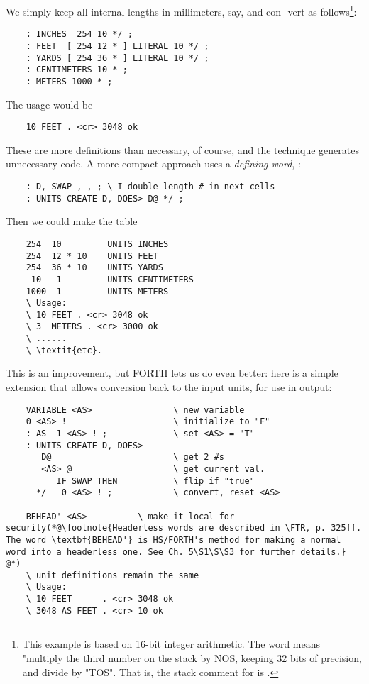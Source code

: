 We simply keep all internal lengths in millimeters, say, and con-
vert as follows\footnote{This example is based on 16-bit integer arithmetic. The word \regc{*/} means "multiply the third number on the stack by NOS, keeping 32 bits of precision, and divide by "TOS". That is, the stack comment for \regc{*/} is .}:

\begin{lstlisting}
    : INCHES  254 10 */ ;
    : FEET  [ 254 12 * ] LITERAL 10 */ ;
    : YARDS [ 254 36 * ] LITERAL 10 */ ;
    : CENTIMETERS 10 * ;
    : METERS 1000 * ;
\end{lstlisting}

The usage would be
\begin{lstlisting}
    10 FEET . <cr> 3048 ok
\end{lstlisting}

These are more definitions than necessary, of course, and the technique generates unnecessary code. A more compact approach uses a \textit{defining word}, :

\begin{lstlisting}
    : D, SWAP , , ; \ I double-length # in next cells
    : UNITS CREATE D, DOES> D@ */ ;
\end{lstlisting}

Then we could make the table
\begin{lstlisting}
    254  10         UNITS INCHES
    254  12 * 10    UNITS FEET
    254  36 * 10    UNITS YARDS
     10   1         UNITS CENTIMETERS
    1000  1         UNITS METERS
    \ Usage:
    \ 10 FEET . <cr> 3048 ok
    \ 3  METERS . <cr> 3000 ok
    \ ......
    \ \textit{etc}.
\end{lstlisting}

This is an improvement, but FORTH lets us do even better: here is a simple extension that allows conversion back to the input units, for use in output:

\begin{lstlisting}
    VARIABLE <AS>                \ new variable
    0 <AS> !                     \ initialize to "F"
    : AS -1 <AS> ! ;             \ set <AS> = "T"
    : UNITS CREATE D, DOES>
       D@                        \ get 2 #s
       <AS> @                    \ get current val.
          IF SWAP THEN           \ flip if "true"
      */   0 <AS> ! ;            \ convert, reset <AS>

    BEHEAD' <AS>          \ make it local for security(*@\footnote{Headerless words are described in \FTR, p. 325ff. The word \textbf{BEHEAD'} is HS/FORTH's method for making a normal word into a headerless one. See Ch. 5\S1\S\S3 for further details.} @*)
    \ unit definitions remain the same
    \ Usage:
    \ 10 FEET      . <cr> 3048 ok
    \ 3048 AS FEET . <cr> 10 ok
\end{lstlisting}

